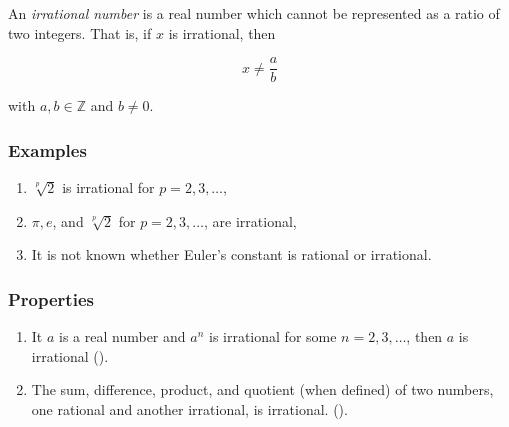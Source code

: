\documentclass[12pt]{article}
\begin{document}
An \emph{irrational number} is a real number which cannot be represented as a ratio of two integers.  That is, if $x$ is irrational, then 

$$ x \ne \frac{a}{b} $$

with $a,b \in \mathbb{Z}$ and $b \ne 0$.

\subsubsection*{Examples}
\begin{enumerate}
\item $\sqrt[p]{2}$ is irrational for $p=2,3,\ldots$,
\item $\pi, e$, and $\sqrt[p]{2}$ for $p=2,3,\ldots$,
       are irrational,
\item It is not known whether Euler's constant is rational or irrational.
\end{enumerate}

\subsubsection*{Properties}
\begin{enumerate}
\item It $a$ is a real number and $a^n$ is irrational for some $n=2,3,\ldots$, 
then $a$ is irrational (). 
\item The sum, difference, product, and quotient (when defined) of two numbers,
one rational and another irrational, is irrational. 
(). 
\end{enumerate}
\end{document}
